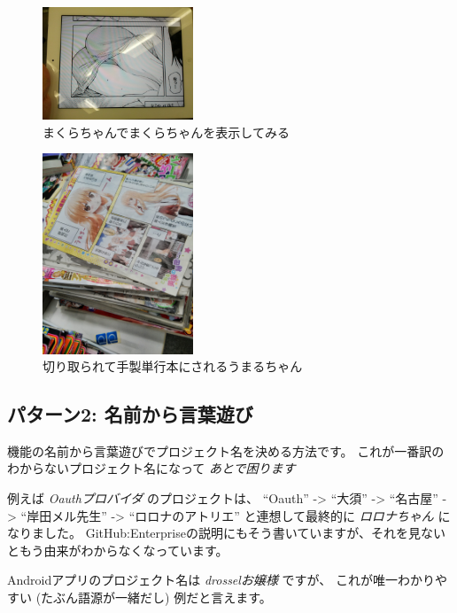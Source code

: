 \begin{figure}[H]
  \centering
  \includegraphics[width=0.4\textwidth]{../images/makura.jpg}
  \caption{まくらちゃんでまくらちゃんを表示してみる}
\end{figure}

\begin{figure}[H]
  \centering
  \includegraphics[width=0.4\textwidth]{../images/umaru.jpg}
  \caption{切り取られて手製単行本にされるうまるちゃん}
\end{figure}

\subsection{パターン2: 名前から言葉遊び}

機能の名前から言葉遊びでプロジェクト名を決める方法です。
これが一番訳のわからないプロジェクト名になって \emph{あとで困ります}

例えば \emph{Oauthプロバイダ} のプロジェクトは、 ``Oauth''
-\textgreater{} ``大須'' -\textgreater{} ``名古屋'' -\textgreater{}
``岸田メル先生'' -\textgreater{} ``ロロナのアトリエ'' と連想して最終的に
\emph{ロロナちゃん} になりました。
GitHub:Enterpriseの説明にもそう書いていますが、それを見ないともう由来がわからなくなっています。

Androidアプリのプロジェクト名は \emph{drosselお嬢様} ですが、
これが唯一わかりやすい (たぶん語源が一緒だし) 例だと言えます。

